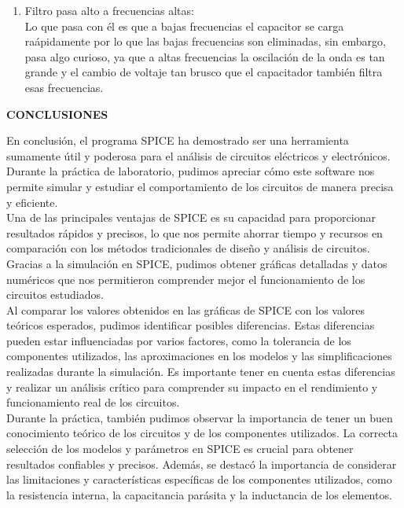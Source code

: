 \documentclass[12pt]{article}
\begin{document}
\begin{enumerate}
\begin{itemize}
			
		\end{itemize}
	
		\item Filtro pasa alto a frecuencias altas:\\
		
		\noindent Lo que pasa con él es que a bajas frecuencias el capacitor se carga raápidamente por lo que las bajas frecuencias son eliminadas, sin embargo, pasa algo curioso, ya que a altas frecuencias la oscilación de la onda es tan grande y el cambio de voltaje tan brusco que el capacitador también filtra esas frecuencias.\\
		
	\end{enumerate}
	
	\newpage
	
	\begin{center}
		\textbf{\large CONCLUSIONES}\\
	\end{center}
	
	En conclusión, el programa SPICE ha demostrado ser una herramienta sumamente útil y poderosa para el análisis de circuitos eléctricos y electrónicos. Durante la práctica de laboratorio, pudimos apreciar cómo este software nos permite simular y estudiar el comportamiento de los circuitos de manera precisa y eficiente.\\
	
	Una de las principales ventajas de SPICE es su capacidad para proporcionar resultados rápidos y precisos, lo que nos permite ahorrar tiempo y recursos en comparación con los métodos tradicionales de diseño y análisis de circuitos. Gracias a la simulación en SPICE, pudimos obtener gráficas detalladas y datos numéricos que nos permitieron comprender mejor el funcionamiento de los circuitos estudiados.\\
	
	Al comparar los valores obtenidos en las gráficas de SPICE con los valores teóricos esperados, pudimos identificar posibles diferencias. Estas diferencias pueden estar influenciadas por varios factores, como la tolerancia de los componentes utilizados, las aproximaciones en los modelos y las simplificaciones realizadas durante la simulación. Es importante tener en cuenta estas diferencias y realizar un análisis crítico para comprender su impacto en el rendimiento y funcionamiento real de los circuitos.\\
	
	Durante la práctica, también pudimos observar la importancia de tener un buen conocimiento teórico de los circuitos y de los componentes utilizados. La correcta selección de los modelos y parámetros en SPICE es crucial para obtener resultados confiables y precisos. Además, se destacó la importancia de considerar las limitaciones y características específicas de los componentes utilizados, como la resistencia interna, la capacitancia parásita y la inductancia de los elementos.\\
	
\end{document}
